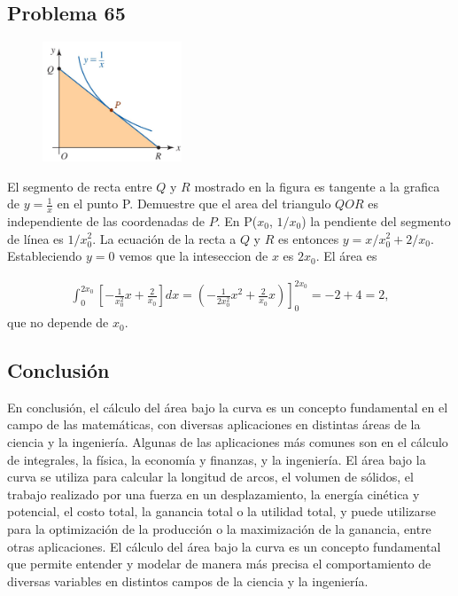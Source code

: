 \documentclass{article}
\begin{document}
\subsection{Problema 65}

\begin{figure}
  \centering
  \includegraphics[width=0.37\textwidth]{./multimedia/Problema65.jpg}
\end{figure}
El segmento de recta entre $ Q$ y $R $ mostrado en la figura es tangente a la grafica de $ y =  \frac{1}{x} $ en el punto P. Demuestre que el area del triangulo $ QOR $ es independiente de las coordenadas de  $ P $.\newline
En P($ x_0$, $ 1/x_0$) la pendiente del segmento de línea es $ 1/x^2_0$. La ecuación de la recta a $ Q $ y $R$ es entonces $y =  x/x^2_0 + 2/x_0$. Estableciendo $ y = 0$ vemos que la inteseccion de $ x$ es $ 2x_0$. El área es

\begin{align*}
  \int_{0}^{2x_0}\left[-\frac{1}{x_0^2}x+\frac{2}{x_0}\right]dx = \left.\left(-\frac{1}{2x_0^2}x^2+\frac{2}{x_0}x\right)\right]_0^{2x_0} = -2+4 = 2,
\end{align*}
que no depende de $x_0$.

\subsection{Conclusión}
En conclusión, el cálculo del área bajo la curva es un concepto fundamental en el campo de las matemáticas, con diversas aplicaciones en distintas áreas de la ciencia y la ingeniería. Algunas de las aplicaciones más comunes son en el cálculo de integrales, la física, la economía y finanzas, y la ingeniería. El área bajo la curva se utiliza para calcular la longitud de arcos, el volumen de sólidos, el trabajo realizado por una fuerza en un desplazamiento, la energía cinética y potencial, el costo total, la ganancia total o la utilidad total, y puede utilizarse para la optimización de la producción o la maximización de la ganancia, entre otras aplicaciones. El cálculo del área bajo la curva es un concepto fundamental que permite entender y modelar de manera más precisa el comportamiento de diversas variables en distintos campos de la ciencia y la ingeniería.
\end{document}
